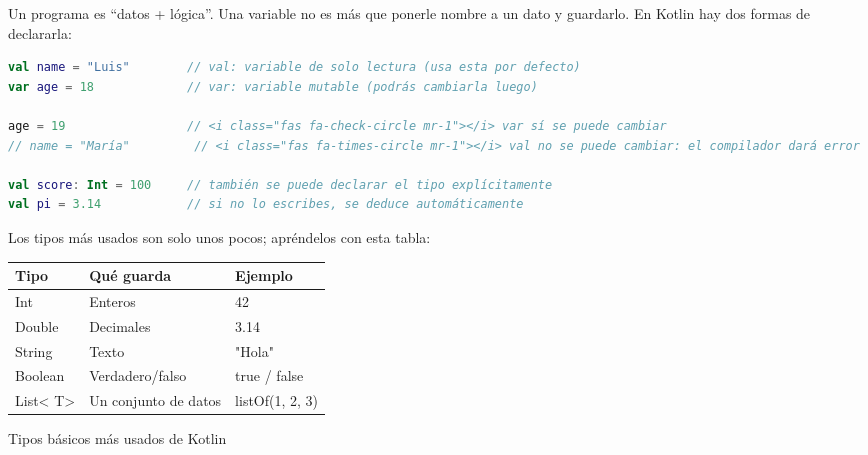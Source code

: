 


Un programa es “datos + lógica”. Una variable no es más que ponerle nombre a un dato y guardarlo. En Kotlin hay dos formas de declararla:

\begin{lstlisting}[language=Kotlin]
val name = "Luis"        // val: variable de solo lectura (usa esta por defecto)
var age = 18             // var: variable mutable (podrás cambiarla luego)

age = 19                 // <i class="fas fa-check-circle mr-1"></i> var sí se puede cambiar
// name = "María"         // <i class="fas fa-times-circle mr-1"></i> val no se puede cambiar: el compilador dará error

val score: Int = 100     // también se puede declarar el tipo explícitamente
val pi = 3.14            // si no lo escribes, se deduce automáticamente
\end{lstlisting}

Los tipos más usados son solo unos pocos; apréndelos con esta tabla:

\begin{center}
\begin{tabularx}{\linewidth}{|X|X|X|}
\hline
\textbf{Tipo} & \textbf{Qué guarda} & \textbf{Ejemplo} \tabularnewline
\hline
Int & Enteros & 42 \tabularnewline
Double & Decimales & 3.14 \tabularnewline
String & Texto & "Hola" \tabularnewline
Boolean & Verdadero/falso & true / false \tabularnewline
List< T> & Un conjunto de datos & listOf(1, 2, 3) \tabularnewline
\hline
\end{tabularx}
\end{center}

\begin{center}\small\color{gray}Tipos básicos más usados de Kotlin\end{center}

